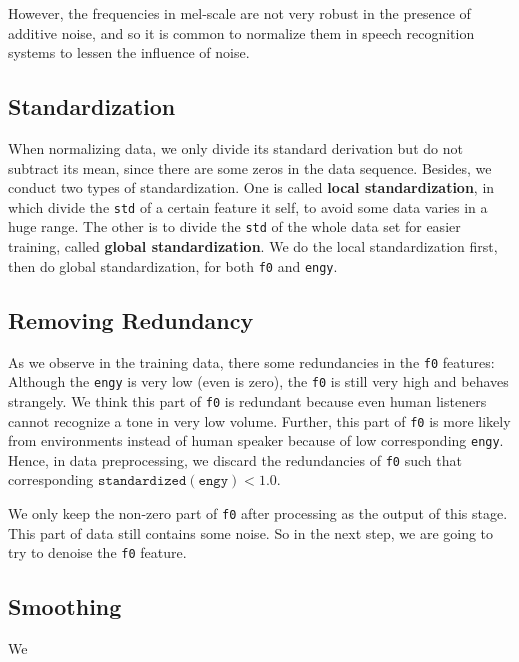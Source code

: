 \documentclass[a4paper]{article}
\begin{document}
However, the frequencies in mel-scale are not very robust in the presence of additive noise, and so it is common to normalize them in speech recognition systems to lessen the influence of noise.
\subsection{Standardization}
When normalizing data, we only divide its standard derivation but do not subtract its mean, since there are some zeros in the data sequence. Besides, we conduct two types of standardization. One is called \textbf{local standardization}, in which divide the \texttt{std} of a certain feature it self, to avoid some data varies in a huge range. The other is to divide the \texttt{std} of the whole data set for easier training, called \textbf{global standardization}. We do the local standardization first, then do global standardization, for both \texttt{f0} and \texttt{engy}.
\subsection{Removing Redundancy}
As we observe in the training data, there some redundancies in the \texttt{f0} features: Although the \texttt{engy} is very low (even is zero), the \texttt{f0} is still very high and behaves strangely. We think this part of \texttt{f0} is redundant because even human listeners cannot recognize a tone in very low volume. Further, this part of \texttt{f0} is more likely from environments instead of human speaker because of low corresponding \texttt{engy}. Hence, in data preprocessing, we discard the redundancies of \texttt{f0} such that corresponding $\mathtt{standardized(engy)} < 1.0$. 

We only keep the non-zero part of \texttt{f0} after processing as the output of this stage. This part of data still contains some noise. So in the next step, we are going to try to denoise the \texttt{f0} feature.

\subsection{Smoothing}
	We 
\end{document}
